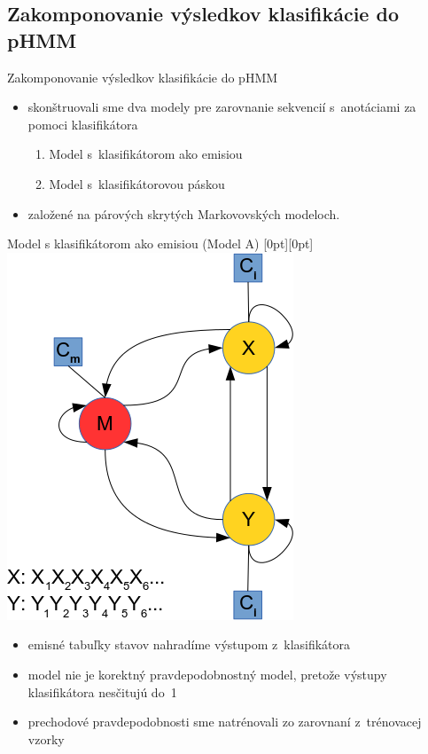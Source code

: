 \documentclass[xcolor=dvipsnames, compress, 12pt]{beamer}
\newcommand{\lenitem}[2][.6\linewidth]{\parbox[t]{#1}{\strut #2\strut}}
\theoremstyle{definition}
\begin{document}
\subsection{Zakomponovanie výsledkov klasifikácie do pHMM}
\begin{frame}{Zakomponovanie výsledkov klasifikácie do pHMM}

\begin{itemize}
  \item skonštruovali sme dva modely pre zarovnanie sekvencií s~anotáciami za pomoci klasifikátora
  \begin{enumerate}
    \item Model s~klasifikátorom ako emisiou
    \item Model s~klasifikátorovou páskou
  \end{enumerate}
  \item založené na párových skrytých Markovovských modeloch.
\end{itemize}

\end{frame}

\begin{frame}{Model s klasifikátorom ako emisiou (Model A)}
  \mbox{}\hfill\raisebox{-\height}[0pt][0pt]{
   \includegraphics[width=.30\textwidth]{images/zakladny_model}
   }
  \vspace*{-\baselineskip}

  \begin{itemize}
    \item \lenitem{emisné tabuľky stavov nahradíme výstupom z~klasifikátora}
    \item \lenitem{model nie je korektný pravdepodobnostný model, pretože výstupy klasifikátora nesčitujú do~1}
    \item \lenitem{prechodové pravdepodobnosti sme natrénovali zo zarovnaní z~trénovacej vzorky}
  \end{itemize}
\end{frame}
\end{document}
